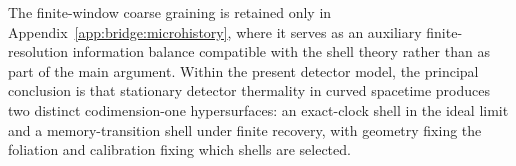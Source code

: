 The finite-window coarse graining is retained only in Appendix~\ref{app:bridge:microhistory}, where it serves as an auxiliary finite-resolution information balance compatible with the shell theory rather than as part of the main argument. Within the present detector model, the principal conclusion is that stationary detector thermality in curved spacetime produces two distinct codimension-one hypersurfaces: an exact-clock shell in the ideal limit and a memory-transition shell under finite recovery, with geometry fixing the foliation and calibration fixing which shells are selected.

